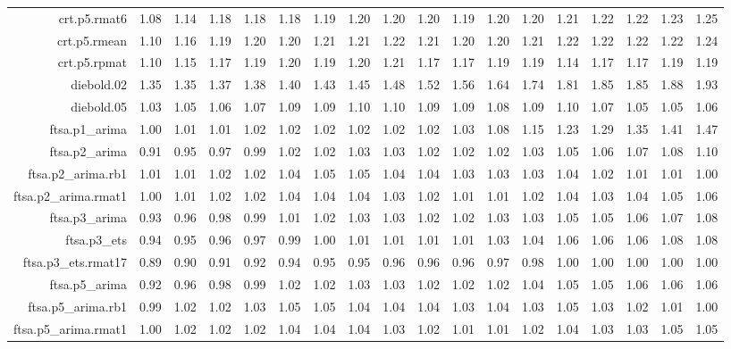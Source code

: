 \begin{tabular}{rrrrrrrrrrrrrrrrrr}
  crt.p5.rmat6 & 1.08 & 1.14 & 1.18 & 1.18 & 1.18 & 1.19 & 1.20 & 1.20 & 1.20 & 1.19 & 1.20 & 1.20 & 1.21 & 1.22 & 1.22 & 1.23 & 1.25 \\ 
  crt.p5.rmean & 1.10 & 1.16 & 1.19 & 1.20 & 1.20 & 1.21 & 1.21 & 1.22 & 1.21 & 1.20 & 1.20 & 1.21 & 1.22 & 1.22 & 1.22 & 1.22 & 1.24 \\ 
  crt.p5.rpmat & 1.10 & 1.15 & 1.17 & 1.19 & 1.20 & 1.19 & 1.20 & 1.21 & 1.17 & 1.17 & 1.19 & 1.19 & 1.14 & 1.17 & 1.17 & 1.19 & 1.19 \\ 
  diebold.02 & 1.35 & 1.35 & 1.37 & 1.38 & 1.40 & 1.43 & 1.45 & 1.48 & 1.52 & 1.56 & 1.64 & 1.74 & 1.81 & 1.85 & 1.85 & 1.88 & 1.93 \\ 
  diebold.05 & 1.03 & 1.05 & 1.06 & 1.07 & 1.09 & 1.09 & 1.10 & 1.10 & 1.09 & 1.09 & 1.08 & 1.09 & 1.10 & 1.07 & 1.05 & 1.05 & 1.06 \\ 
  ftsa.p1\_arima & 1.00 & 1.01 & 1.01 & 1.02 & 1.02 & 1.02 & 1.02 & 1.02 & 1.02 & 1.03 & 1.08 & 1.15 & 1.23 & 1.29 & 1.35 & 1.41 & 1.47 \\ 
  ftsa.p2\_arima & 0.91 & 0.95 & 0.97 & 0.99 & 1.02 & 1.02 & 1.03 & 1.03 & 1.02 & 1.02 & 1.02 & 1.03 & 1.05 & 1.06 & 1.07 & 1.08 & 1.10 \\ 
  ftsa.p2\_arima.rb1 & 1.01 & 1.01 & 1.02 & 1.02 & 1.04 & 1.05 & 1.05 & 1.04 & 1.04 & 1.03 & 1.03 & 1.03 & 1.04 & 1.02 & 1.01 & 1.01 & 1.00 \\ 
  ftsa.p2\_arima.rmat1 & 1.00 & 1.01 & 1.02 & 1.02 & 1.04 & 1.04 & 1.04 & 1.03 & 1.02 & 1.01 & 1.01 & 1.02 & 1.04 & 1.03 & 1.04 & 1.05 & 1.06 \\ 
  ftsa.p3\_arima & 0.93 & 0.96 & 0.98 & 0.99 & 1.01 & 1.02 & 1.03 & 1.03 & 1.02 & 1.02 & 1.03 & 1.03 & 1.05 & 1.05 & 1.06 & 1.07 & 1.08 \\ 
  ftsa.p3\_ets & 0.94 & 0.95 & 0.96 & 0.97 & 0.99 & 1.00 & 1.01 & 1.01 & 1.01 & 1.01 & 1.03 & 1.04 & 1.06 & 1.06 & 1.06 & 1.08 & 1.08 \\ 
  ftsa.p3\_ets.rmat17 & 0.89 & 0.90 & 0.91 & 0.92 & 0.94 & 0.95 & 0.95 & 0.96 & 0.96 & 0.96 & 0.97 & 0.98 & 1.00 & 1.00 & 1.00 & 1.00 & 1.00 \\ 
  ftsa.p5\_arima & 0.92 & 0.96 & 0.98 & 0.99 & 1.02 & 1.02 & 1.03 & 1.03 & 1.02 & 1.02 & 1.02 & 1.04 & 1.05 & 1.05 & 1.06 & 1.06 & 1.06 \\ 
  ftsa.p5\_arima.rb1 & 0.99 & 1.02 & 1.02 & 1.03 & 1.05 & 1.05 & 1.04 & 1.04 & 1.04 & 1.03 & 1.04 & 1.03 & 1.05 & 1.03 & 1.02 & 1.01 & 1.00 \\ 
  ftsa.p5\_arima.rmat1 & 1.00 & 1.02 & 1.02 & 1.02 & 1.04 & 1.04 & 1.04 & 1.03 & 1.02 & 1.01 & 1.01 & 1.02 & 1.04 & 1.03 & 1.03 & 1.05 & 1.05 \\ 

\end{tabular}
